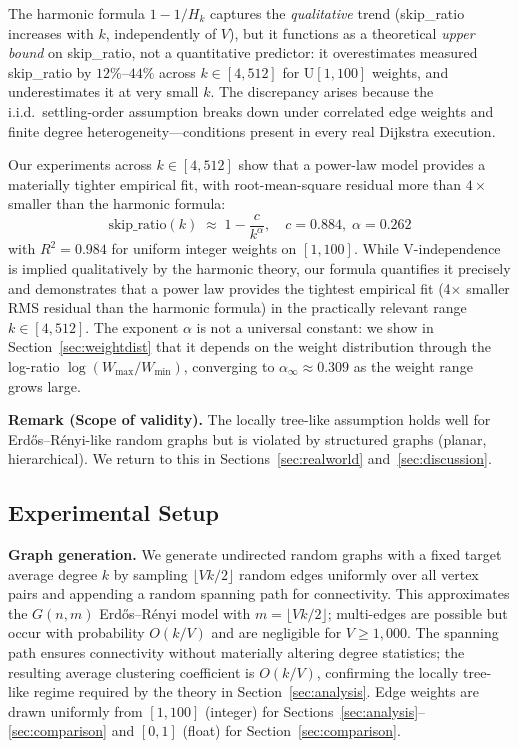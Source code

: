 \documentclass[conference]{IEEEtran}
\begin{document}
The harmonic formula $1-1/H_k$ captures the \emph{qualitative} trend
(skip\_ratio increases with $k$, independently of $V$), but it functions
as a theoretical \emph{upper bound} on skip\_ratio, not a quantitative
predictor: it overestimates measured skip\_ratio by $12\%$--$44\%$ across
$k\in[4,512]$ for $\mathrm{U}[1,100]$ weights, and underestimates it at
very small $k$.  The discrepancy arises because the i.i.d.\ settling-order
assumption breaks down under correlated edge weights and finite degree
heterogeneity---conditions present in every real Dijkstra execution.

Our experiments across $k\in[4,512]$ show that a power-law model provides
a materially tighter empirical fit, with root-mean-square residual more
than $4\times$ smaller than the harmonic formula:
\begin{equation}
  \boxed{\;\text{skip\_ratio}(k) \;\approx\; 1 - \frac{c}{k^{\alpha}},
  \quad c = 0.884,\;\alpha = 0.262\;} \label{eq:powerlaw}
\end{equation}
with $R^2=0.984$ for uniform integer weights on $[1,100]$.
While V-independence is implied qualitatively by the harmonic theory,
our formula quantifies it precisely and demonstrates that a power law
provides the tightest empirical fit (4$\times$ smaller RMS residual than
the harmonic formula) in the practically relevant range $k\in[4,512]$.
The exponent $\alpha$ is not a universal constant: we show in
Section~\ref{sec:weightdist} that it depends on the weight distribution
through the log-ratio $\log(W_{\max}/W_{\min})$, converging to
$\alpha_\infty\approx 0.309$ as the weight range grows large.

\noindent\textbf{Remark (Scope of validity).}
The locally tree-like assumption holds well for Erd\H{o}s--R\'enyi-like
random graphs but is violated by structured graphs (planar, hierarchical).
We return to this in Sections~\ref{sec:realworld} and~\ref{sec:discussion}.

\subsection{Experimental Setup}

\noindent\textbf{Graph generation.}  We generate undirected random graphs
with a fixed target average degree $k$ by sampling $\lfloor Vk/2\rfloor$
random edges uniformly over all vertex pairs and appending a random
spanning path for connectivity.  This approximates the $G(n,m)$
Erd\H{o}s--R\'enyi model with $m=\lfloor Vk/2\rfloor$; multi-edges
are possible but occur with probability $O(k/V)$ and are negligible
for $V\geq 1{,}000$.  The spanning path ensures connectivity without
materially altering degree statistics; the resulting average clustering
coefficient is $O(k/V)$, confirming the locally tree-like regime
required by the theory in Section~\ref{sec:analysis}.
Edge weights are drawn uniformly from $[1, 100]$ (integer) for
Sections~\ref{sec:analysis}--\ref{sec:comparison} and $[0, 1]$ (float)
for Section~\ref{sec:comparison}.
\end{document}
